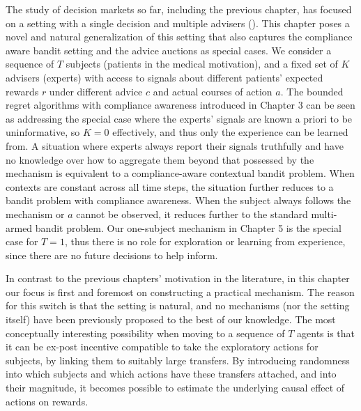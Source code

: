 The study of decision markets so far, including the previous chapter, has focused on a setting with a single decision and multiple advisers (\cite{hanson2002decision,othman2010decision,chen2014eliciting}).
This chapter poses a novel and natural generalization of this setting that also captures the compliance aware bandit setting and the advice auctions as special cases. 
We consider a sequence of $T$ subjects (patients in the medical motivation), and a fixed set of $K$ advisers (experts) with access to signals about different patients' expected rewards $r$ under different advice $c$ and actual courses of action $a$. 
The bounded regret algorithms with compliance awareness introduced in Chapter 3 can be seen as addressing the special case where the experts' signals are known a priori to be uninformative, so $K=0$ effectively, and thus only the experience can be learned from.
A situation where experts always report their signals truthfully and have no knowledge over how to aggregate them beyond that possessed by the mechanism is equivalent to a compliance-aware contextual bandit problem. 
When contexts are constant across all time steps, the situation further reduces to a bandit problem with compliance awareness.
When the subject always follows the mechanism or $a$ cannot be observed, it reduces further  to the standard multi-armed bandit problem. 
Our one-subject mechanism in Chapter 5 is the special case for $T=1$, thus there is no role for exploration or learning from experience, since there are no future decisions to help inform.


In contrast to the previous chapters' motivation in the literature, in this chapter our focus is first and foremost on constructing a practical mechanism. 
The reason for this switch is that the setting is natural, and no mechanisms (nor the setting itself) have been previously proposed to the best of our knowledge.
The most conceptually interesting possibility when moving to a sequence of $T$ agents is that it can be ex-post incentive compatible to take the exploratory actions for subjects, by linking them to suitably large transfers. By introducing randomness into which subjects and which actions have these transfers attached, and into their magnitude, it becomes possible to estimate the underlying causal effect of actions on rewards. 


